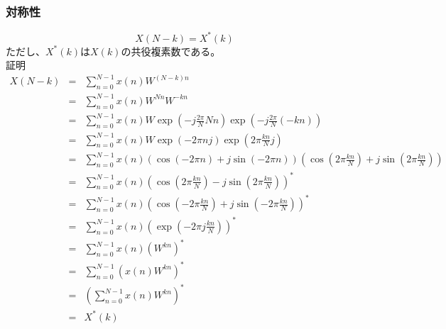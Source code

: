 \documentclass[a4paper]{jsarticle}
\begin{document}
\subsubsection{対称性}
\begin{equation}
X \left( N - k \right) = X^\ast \left( k \right)
\end{equation}
ただし、$X^\ast \left( k \right)$は$X \left( k \right)$の共役複素数である。\\
証明
\begin{eqnarray}
	X \left( N - k \right) &=& \sum _{n = 0} ^{N - 1} x \left( n \right) W ^{\left( N - k \right) n} \nonumber \\
	&=& \sum _{n = 0} ^{N - 1} x \left( n \right) W ^{Nn} W ^{-kn} \nonumber \\
	&=& \sum _{n = 0} ^{N - 1} x \left( n \right) W \exp \left(-j \frac{2 \pi}{N} Nn \right) \exp \left( -j \frac{2 \pi}{N} \left( -kn \right) \right) \nonumber \\
	&=& \sum _{n = 0} ^{N - 1} x \left( n \right) W \exp \left( -2 \pi nj \right) \exp \left( 2 \pi \frac{kn}{N} j \right) \nonumber \\
	&=& \sum _{n = 0} ^{N - 1} x \left( n \right) \left( \cos \left( -2 \pi n \right) + j \sin \left(-2 \pi n \right) \right) \left( \cos \left( 2 \pi \frac{kn}{N} \right) + j \sin \left( 2 \pi \frac{kn}{N} \right) \right) \nonumber \\
	&=& \sum _{n = 0} ^{N - 1} x \left( n \right) \left( \cos \left( 2 \pi \frac{kn}{N} \right) - j \sin \left( 2 \pi \frac{kn}{N} \right) \right) ^\ast \nonumber \\
	&=& \sum _{n = 0} ^{N - 1} x \left( n \right) \left( \cos \left( -2 \pi \frac{kn}{N} \right) + j \sin \left( -2 \pi \frac{kn}{N} \right) \right) ^\ast \nonumber \\
	&=& \sum _{n = 0} ^{N - 1} x \left( n \right) \left( \exp \left( -2 \pi j \frac{kn}{N} \right) \right) ^\ast \nonumber \\
	&=& \sum _{n = 0} ^{N - 1} x \left( n \right) \left( W ^{kn} \right) ^\ast \nonumber \\
	&=& \sum _{n = 0} ^{N - 1} \left( x \left( n \right) W ^{kn} \right) ^\ast \nonumber \\
	&=& \left( \sum _{n = 0} ^{N - 1} x \left( n \right) W ^{kn} \right) ^\ast \nonumber \\
	&=& X ^\ast \left( k \right)
\end{eqnarray}
\end{document}
